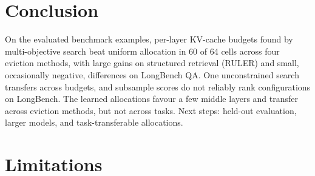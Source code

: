 \documentclass[11pt]{article}
\begin{document}
\section{Conclusion}

On the evaluated benchmark examples, per-layer KV-cache budgets found by multi-objective search beat uniform allocation in 60 of 64 cells across four eviction methods, with large gains on structured retrieval (RULER) and small, occasionally negative, differences on LongBench QA. One unconstrained search transfers across budgets, and subsample scores do not reliably rank configurations on LongBench. The learned allocations favour a few middle layers and transfer across eviction methods, but not across tasks. Next steps: held-out evaluation, larger models, and task-transferable allocations.

\section*{Limitations}
\end{document}
